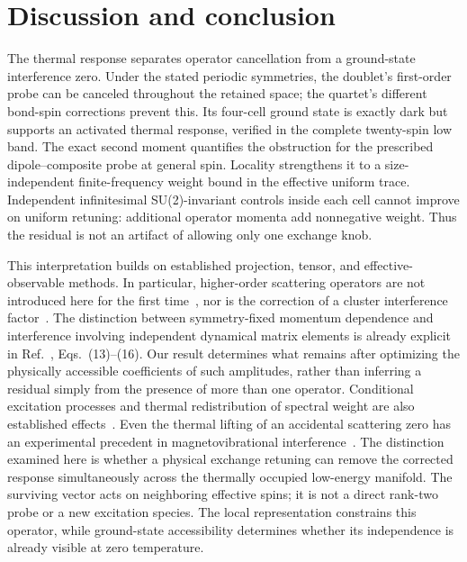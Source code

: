 \section{Discussion and conclusion}

The thermal response separates operator cancellation from a ground-state
interference zero. Under the stated periodic symmetries, the doublet's
first-order probe can be canceled throughout the retained space; the
quartet's different bond-spin corrections prevent this. Its four-cell
ground state is exactly dark but supports an activated thermal response,
verified in the complete twenty-spin low band.
The exact second moment quantifies the obstruction for the prescribed
dipole--composite probe at general spin. Locality strengthens it to a
size-independent finite-frequency weight bound in the effective uniform
trace. Independent infinitesimal SU(2)-invariant controls inside each cell
cannot improve on uniform retuning: additional operator momenta add
nonnegative weight. Thus the residual is not an artifact of allowing only
one exchange knob.

This interpretation builds on established projection, tensor, and
effective-observable methods. In particular, higher-order scattering operators
are not introduced here for the first time~\cite{waldmann2005manyspin}, nor is
the correction of a cluster interference factor~\cite{mueller2003structure}.
The distinction between symmetry-fixed momentum dependence and
interference involving independent dynamical matrix elements is already
explicit in Ref.~, Eqs.~(13)--(16).
Our result determines what remains after optimizing the physically
accessible coefficients of such amplitudes, rather than inferring a
residual simply from the presence of more than one operator.
Conditional excitation processes and thermal redistribution of spectral
weight are also established effects~\cite{exius2010vertex,honecker2016thermal}.
Even the thermal lifting of an accidental scattering zero has an
experimental precedent in magnetovibrational interference~\cite{raymond2018interference}.
The distinction examined here is whether a physical exchange retuning can
remove the corrected response simultaneously across the thermally occupied
low-energy manifold. The surviving vector acts on neighboring effective
spins; it is not a direct rank-two probe or a new excitation species.
The local representation constrains this operator, while ground-state
accessibility determines whether its independence is already visible at
zero temperature.

